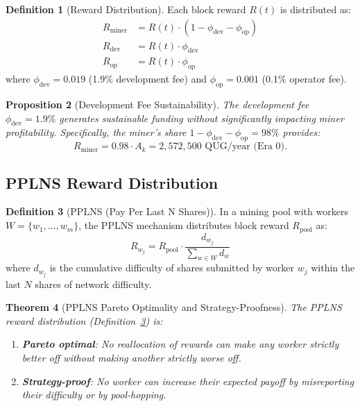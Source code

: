 \documentclass[11pt,a4paper]{article}
\newtheorem{theorem}{Theorem}[section]
\newtheorem{proposition}[theorem]{Proposition}
\theoremstyle{definition}
\newtheorem{definition}[theorem]{Definition}
\theoremstyle{remark}
\newcommand{\reward}{R}
\begin{document}
\begin{definition}[Reward Distribution]\label{def:fee-dist}
Each block reward $\reward(t)$ is distributed as:
\begin{align}
  \reward_{\text{miner}} &= \reward(t) \cdot (1 - \phi_{\text{dev}} -
    \phi_{\text{op}}) \label{eq:miner-share} \\
  \reward_{\text{dev}} &= \reward(t) \cdot \phi_{\text{dev}}
    \label{eq:dev-share} \\
  \reward_{\text{op}} &= \reward(t) \cdot \phi_{\text{op}}
    \label{eq:op-share}
\end{align}
where $\phi_{\text{dev}} = 0.019$ (1.9\% development fee) and
$\phi_{\text{op}} = 0.001$ (0.1\% operator fee).
\end{definition}

\begin{proposition}[Development Fee Sustainability]\label{prop:dev-fee}
The development fee $\phi_{\text{dev}} = 1.9\%$ generates sustainable
funding without significantly impacting miner profitability.
Specifically, the miner's share $1 - \phi_{\text{dev}} - \phi_{\text{op}}
= 98\%$ provides:
\[
  \reward_{\text{miner}} = 0.98 \cdot A_k = 2{,}572{,}500 \text{ QUG/year (Era 0)}.
\]
\end{proposition}

\subsection{PPLNS Reward Distribution}

\begin{definition}[PPLNS (Pay Per Last N Shares)]\label{def:pplns}
In a mining pool with workers $W = \{w_1, \ldots, w_m\}$, the PPLNS
mechanism distributes block reward $\reward_{\text{pool}}$ as:
\begin{equation}\label{eq:pplns}
  \reward_{w_j} = \reward_{\text{pool}} \cdot
  \frac{d_{w_j}}{\sum_{w \in W} d_w}
\end{equation}
where $d_{w_j}$ is the cumulative difficulty of shares submitted by
worker $w_j$ within the last $N$ shares of network difficulty.
\end{definition}

\begin{theorem}[PPLNS Pareto Optimality and Strategy-Proofness]\label{thm:pplns}
The PPLNS reward distribution (Definition~\ref{def:pplns}) is:
\begin{enumerate}[label=(\roman*)]
  \item \textbf{Pareto optimal}: No reallocation of rewards can make
    any worker strictly better off without making another strictly worse off.
  \item \textbf{Strategy-proof}: No worker can increase their expected
    payoff by misreporting their difficulty or by pool-hopping.
\end{enumerate}
\end{theorem}
\end{document}
